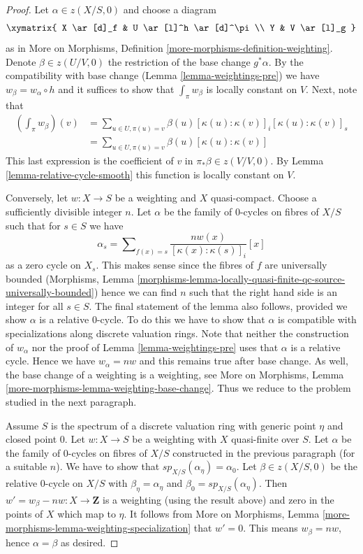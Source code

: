 \begin{proof}
Let $\alpha \in z(X/S, 0)$ and choose a diagram
$$
\xymatrix{
X \ar[d]_f & U \ar[l]^h \ar[d]^\pi \\
Y & V \ar[l]_g
}
$$
as in More on Morphisms, Definition \ref{more-morphisms-definition-weighting}.
Denote $\beta \in z(U/V, 0)$ the restriction of the base change $g^*\alpha$.
By the compatibility with base change (Lemma \ref{lemma-weightings-pre})
we have $w_\beta = w_\alpha \circ h$ and it suffices to show that
$\int_\pi w_\beta$ is locally constant on $V$. Next, note that
\begin{align*}
\left( \int_\pi w_\beta \right)(v)
& =
\sum\nolimits_{u \in U, \pi(u) = v} 
\beta(u) [\kappa(u) : \kappa(v)]_i [\kappa(u) : \kappa(v)]_s \\
& =
\sum\nolimits_{u \in U, \pi(u) = v} \beta(u)[\kappa(u) : \kappa(v)]
\end{align*}
This last expression is the coefficient of $v$ in $\pi_*\beta \in z(V/V, 0)$.
By Lemma \ref{lemma-relative-cycle-smooth} this function is locally
constant on $V$.

\medskip\noindent
Conversely, let $w : X \to S$ be a weighting and $X$ quasi-compact.
Choose a sufficiently divisible integer $n$. Let $\alpha$ be the family
of $0$-cycles on fibres of $X/S$ such that for $s \in S$ we have
$$
\alpha_s =
\sum\nolimits_{f(x) = s} \frac{n w(x)}{[\kappa(x) : \kappa(s)]_i} [x]
$$
as a zero cycle on $X_s$.
This makes sense since the fibres of $f$ are universally bounded
(Morphisms, Lemma
\ref{morphisms-lemma-locally-quasi-finite-qc-source-universally-bounded})
hence we can find $n$ such that the right hand side is an integer for
all $s \in S$. The final statement of the lemma also follows, provided
we show $\alpha$ is a relative $0$-cycle. To do this we have to
show that $\alpha$ is compatible with specializations along discrete
valuation rings. Note that neither the construction of $w_\alpha$
nor the proof of Lemma \ref{lemma-weightings-pre} uses that $\alpha$
is a relative cycle. Hence we have $w_\alpha = nw$ and this remains
true after base change. As well, the base change of a weighting
is a weighting, see
More on Morphisms, Lemma \ref{more-morphisms-lemma-weighting-base-change}.
Thus we reduce to the problem studied in the next paragraph.

\medskip\noindent
Assume $S$ is the spectrum of a discrete valuation ring with generic
point $\eta$ and closed point $0$. Let $w : X \to S$ be a weighting with
$X$ quasi-finite over $S$. Let $\alpha$ be the family of $0$-cycles on
fibres of $X/S$ constructed in the previous paragraph (for a suitable $n$).
We have to show that $sp_{X/S}(\alpha_\eta) = \alpha_0$.
Let $\beta \in z(X/S, 0)$ be the relative $0$-cycle on $X/S$
with $\beta_\eta = \alpha_\eta$ and $\beta_0 = sp_{X/S}(\alpha_\eta)$.
Then $w' = w_\beta - nw : X \to \mathbf{Z}$
is a weighting (using the result above) and zero in the points of $X$
which map to $\eta$. It follows from More on Morphisms,
Lemma \ref{more-morphisms-lemma-weighting-specialization}
that $w' = 0$. This means $w_\beta = nw$, hence $\alpha = \beta$ as desired.
\end{proof}

